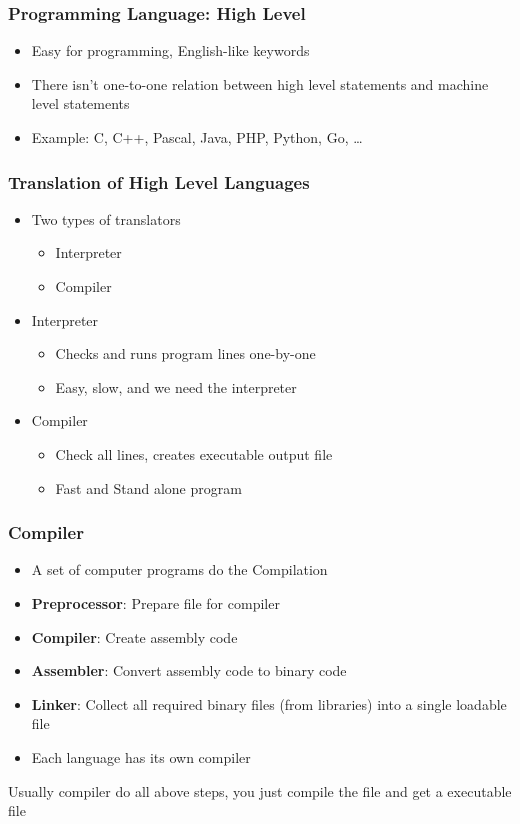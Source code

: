 \documentclass{../c-lecture}
\begin{document}
\begin{frame}
  \frametitle{Programming Language: High Level}
  \begin{itemize}
    \item Easy for programming, English-like keywords
    \item
      There isn’t one-to-one relation between high level statements and machine
      level statements
    \item Example: C, C++, Pascal, Java, PHP, Python, Go, \ldots
  \end{itemize}
\end{frame}

\begin{frame}
  \frametitle{Translation of High Level Languages}
  \begin{itemize}
    \item Two types of translators
    \begin{itemize}
      \item Interpreter
      \item Compiler
    \end{itemize}
    \item Interpreter
    \begin{itemize}
      \item Checks and runs program lines one-by-one
      \item Easy, slow, and we need the interpreter
    \end{itemize}
    \item Compiler
    \begin{itemize}
      \item Check all lines, creates executable output file
      \item Fast and Stand alone program
    \end{itemize}
  \end{itemize}
\end{frame}

\begin{frame}
  \frametitle{Compiler}
  \begin{itemize}
    \item
      A {\color{Orange} set} of computer programs do the
      {\color{Green} Compilation}
    \item
      \textbf{\color{Orange} Preprocessor}: Prepare file for compiler
    \item \textbf{\color{Orange} Compiler}: Create assembly code
    \item
      \textbf{\color{Green} Assembler}: Convert assembly code to binary
      code
    \item
      \textbf{\color{Green} Linker}: Collect all required binary files
      (from libraries) into a single loadable file
    \item Each language has its own compiler
  \end{itemize}

  \begin{block}{}
  Usually compiler do all above steps, you just compile the file and get a
  executable file
  \end{block}
\end{frame}
\end{document}
